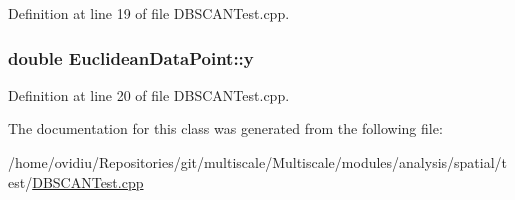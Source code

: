 Definition at line 19 of file D\-B\-S\-C\-A\-N\-Test.\-cpp.

\hypertarget{classEuclideanDataPoint_a108d29336be8bf0bd1aa53c40df3bd68}{
\subsubsection[{y}]{\setlength{\rightskip}{0pt plus 5cm}double Euclidean\-Data\-Point\-::y\hspace{0.3cm}{\ttfamily [private]}}}\label{classEuclideanDataPoint_a108d29336be8bf0bd1aa53c40df3bd68}


Definition at line 20 of file D\-B\-S\-C\-A\-N\-Test.\-cpp.



The documentation for this class was generated from the following file\-:\begin{DoxyCompactItemize}
\item 
/home/ovidiu/\-Repositories/git/multiscale/\-Multiscale/modules/analysis/spatial/test/\hyperlink{DBSCANTest_8cpp}{D\-B\-S\-C\-A\-N\-Test.\-cpp}\end{DoxyCompactItemize}
